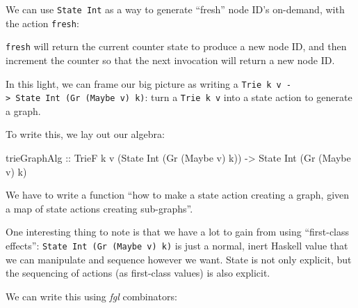 \documentclass[]{article}
\newenvironment{Shaded}{}{}
\newcommand{\CommentTok}[1]{\textcolor[rgb]{0.38,0.63,0.69}{\textit{#1}}}
\newcommand{\DataTypeTok}[1]{\textcolor[rgb]{0.56,0.13,0.00}{#1}}
\newcommand{\DecValTok}[1]{\textcolor[rgb]{0.25,0.63,0.44}{#1}}
\newcommand{\FunctionTok}[1]{\textcolor[rgb]{0.02,0.16,0.49}{#1}}
\newcommand{\NormalTok}[1]{#1}
\newcommand{\OtherTok}[1]{\textcolor[rgb]{0.00,0.44,0.13}{#1}}
\begin{document}
We can use \texttt{State\ Int} as a way to generate ``fresh'' node ID's
on-demand, with the action \texttt{fresh}:

\begin{Shaded}
\end{Shaded}

\texttt{fresh} will return the current counter state to produce a new node ID,
and then increment the counter so that the next invocation will return a new
node ID.

In this light, we can frame our big picture as writing a
\texttt{Trie\ k\ v\ -\textgreater{}\ State\ Int\ (Gr\ (Maybe\ v)\ k)}: turn a
\texttt{Trie\ k\ v} into a state action to generate a graph.

To write this, we lay out our algebra:

\begin{Shaded}
\begin{Highlighting}[]
\NormalTok{trieGraphAlg}
\OtherTok{    ::} \DataTypeTok{TrieF}\NormalTok{ k v (}\DataTypeTok{State} \DataTypeTok{Int}\NormalTok{ (}\DataTypeTok{Gr}\NormalTok{ (}\DataTypeTok{Maybe}\NormalTok{ v) k))}
    \OtherTok{->} \DataTypeTok{State} \DataTypeTok{Int}\NormalTok{ (}\DataTypeTok{Gr}\NormalTok{ (}\DataTypeTok{Maybe}\NormalTok{ v) k)}
\end{Highlighting}
\end{Shaded}

We have to write a function ``how to make a state action creating a graph, given
a map of state actions creating sub-graphs''.

One interesting thing to note is that we have a lot to gain from using
``first-class effects'': \texttt{State\ Int\ (Gr\ (Maybe\ v)\ k)} is just a
normal, inert Haskell value that we can manipulate and sequence however we want.
State is not only explicit, but the sequencing of actions (as first-class
values) is also explicit.

We can write this using \emph{fgl} combinators:
\end{document}
